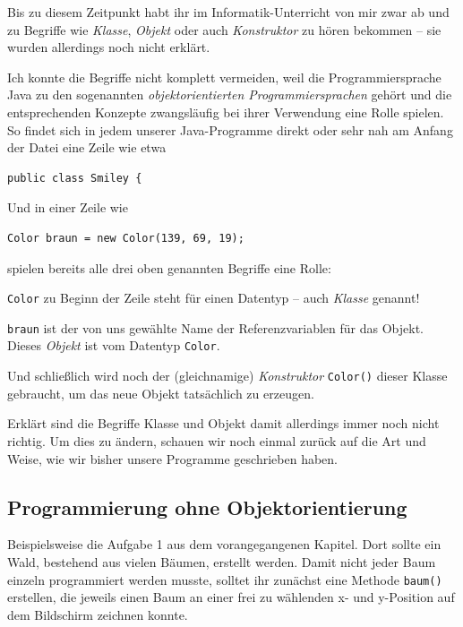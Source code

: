 Bis zu diesem Zeitpunkt habt ihr im Informatik-Unterricht von mir zwar ab und zu Begriffe 
wie \emph{Klasse}, \emph{Objekt} oder auch \emph{Konstruktor} zu hören bekommen -- sie 
wurden allerdings noch nicht erklärt.

Ich konnte die Begriffe nicht komplett vermeiden, weil die Programmiersprache Java
zu den sogenannten \emph{objektorientierten Programmiersprachen} gehört und die entsprechenden
Konzepte zwangsläufig bei ihrer Verwendung eine Rolle spielen. So findet sich in jedem unserer
Java-Programme direkt oder sehr nah am Anfang der Datei eine Zeile wie etwa

\begin{lstlisting}
public class Smiley {
\end{lstlisting}

Und in einer Zeile wie

\begin{lstlisting}
Color braun = new Color(139, 69, 19);
\end{lstlisting}

spielen bereits alle drei oben genannten Begriffe eine Rolle:

\lstinline|Color| zu Beginn der Zeile steht für einen Datentyp -- auch \emph{Klasse} genannt!

\lstinline|braun| ist der von uns gewählte Name der Referenzvariablen für das Objekt. Dieses \emph{Objekt} ist vom Datentyp \lstinline|Color|.

Und schließlich wird noch der (gleichnamige) \emph{Konstruktor} \lstinline|Color()| dieser Klasse 
gebraucht, um das neue Objekt tatsächlich zu erzeugen.

Erklärt sind die Begriffe Klasse und Objekt damit allerdings immer noch nicht richtig. Um dies zu 
ändern, schauen wir noch einmal zurück auf die Art und Weise, wie wir bisher unsere
Programme geschrieben haben.

\subsection{Programmierung ohne Objektorientierung}

Beispielsweise die Aufgabe 1 aus dem vorangegangenen Kapitel. Dort sollte ein Wald, bestehend aus
vielen Bäumen, erstellt werden. Damit nicht jeder Baum einzeln programmiert werden musste, solltet ihr
zunächst eine Methode \lstinline|baum()| erstellen, die jeweils einen Baum an einer frei zu wählenden
x- und y-Position auf dem Bildschirm zeichnen konnte.

